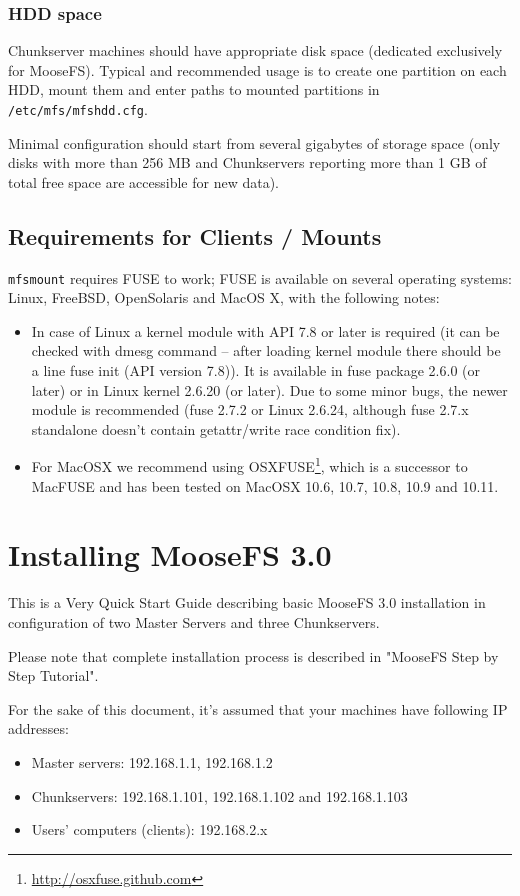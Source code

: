 \documentclass[a4paper,11pt,english]{report}
\def\code#1{\texttt{#1}}
\begin{document}
			\subsection{HDD space}
			Chunkserver machines should have appropriate disk space (dedicated exclusively for MooseFS). Typical and recommended usage is to create one partition on each HDD, mount them and enter paths to mounted partitions in \code{/etc/mfs/mfshdd.cfg}.
		
			Minimal configuration should start from several gigabytes of storage space (only disks with more than 256 MB and Chunkservers reporting more than 1 GB of total free space are accessible for new data).

		\section{Requirements for Clients / Mounts}
		\code{mfsmount} requires FUSE to work; FUSE is available on several operating systems: Linux, FreeBSD, OpenSolaris and MacOS X, with the following notes:
		
		\begin{itemize}
			\item In case of Linux a kernel module with API 7.8 or later is required (it can be checked with dmesg command -- after loading kernel module there should be a line fuse init (API version 7.8)). It is available in fuse package 2.6.0 (or later) or in Linux kernel 2.6.20 (or later). Due to some minor bugs, the newer module is recommended (fuse 2.7.2 or Linux 2.6.24, although fuse 2.7.x standalone doesn't contain getattr/write race condition fix).
			\item For MacOSX we recommend using OSXFUSE\footnote{\url{http://osxfuse.github.com}}, which is a successor to MacFUSE and has been tested on MacOSX 10.6, 10.7, 10.8, 10.9 and 10.11.
		\end{itemize}




	\chapter{Installing MooseFS 3.0}
	This is a Very Quick Start Guide describing basic MooseFS 3.0 installation in configuration of two Master Servers and three Chunkservers.
	
	Please note that complete installation process is described in "MooseFS Step by Step Tutorial".
	
	For the sake of this document, it's assumed that your machines have following IP addresses:
	\begin{itemize}
		\item Master servers: 192.168.1.1, 192.168.1.2
		\item Chunkservers: 192.168.1.101, 192.168.1.102 and 192.168.1.103
		\item Users' computers (clients): 192.168.2.x
	\end{itemize}
\end{document}
